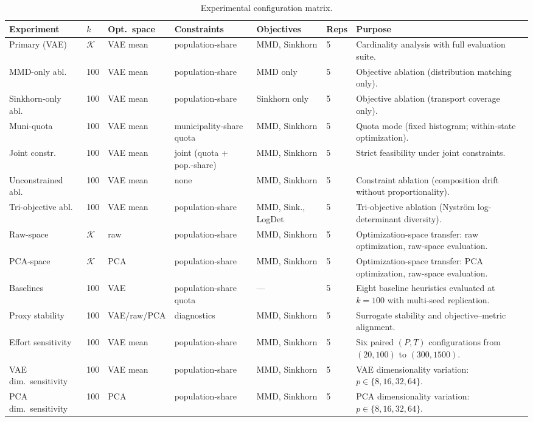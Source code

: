 \documentclass[10pt,journal]{IEEEtran}
\newcommand{\kGrid}{\mathcal{K}}
\newcommand{\1}{\mathbf{1}}
\theoremstyle{ieeethm}
\begin{document}
\begin{table}[t]
\centering
\caption{Experimental configuration matrix.}
\label{tab:run-matrix}
\renewcommand{\arraystretch}{1.05}
\setlength{\tabcolsep}{5pt}
\begin{tabular}{p{}p{}p{}p{}p{}p{}p{}}
\toprule
Experiment & $k$ & Opt.\ space & Constraints & Objectives & Reps & Purpose \\
\midrule
Primary (VAE) & $\kGrid$ & VAE mean & population-share & MMD, Sinkhorn & 5 &
Cardinality analysis with full evaluation suite. \\
MMD-only abl.\ & 100 & VAE mean & population-share & MMD only & 5 &
Objective ablation (distribution matching only). \\
Sinkhorn-only abl.\ & 100 & VAE mean & population-share & Sinkhorn only & 5 &
Objective ablation (transport coverage only). \\
Muni-quota & 100 & VAE mean & municipality-share quota & MMD, Sinkhorn & 5 &
Quota mode (fixed histogram; within-state optimization). \\
Joint constr.\ & 100 & VAE mean & joint (quota + pop.-share) & MMD, Sinkhorn & 5 &
Strict feasibility under joint constraints. \\
Unconstrained abl.\ & 100 & VAE mean & none & MMD, Sinkhorn & 5 &
Constraint ablation (composition drift without proportionality). \\
Tri-objective abl.\ & 100 & VAE mean & population-share & MMD, Sink., LogDet & 5 &
Tri-objective ablation (Nystr\"{o}m log-determinant diversity). \\
Raw-space & $\kGrid$ & raw & population-share & MMD, Sinkhorn & 5 &
Optimization-space transfer: raw optimization, raw-space evaluation. \\
PCA-space & $\kGrid$ & PCA & population-share & MMD, Sinkhorn & 5 &
Optimization-space transfer: PCA optimization, raw-space evaluation. \\
Baselines & 100 & VAE & population-share quota & --- & 5 &
Eight baseline heuristics evaluated at $k{=}100$ with multi-seed replication. \\
Proxy stability & 100 & VAE/raw/PCA & diagnostics & MMD, Sinkhorn & 5 &
Surrogate stability and objective--metric alignment. \\
Effort sensitivity & 100 & VAE mean & population-share & MMD, Sinkhorn & 5 &
Six paired $(P,T)$ configurations from $(20,100)$ to $(300,1500)$. \\
VAE dim.\ sensitivity & 100 & VAE mean & population-share & MMD, Sinkhorn & 5 &
VAE dimensionality variation: $p\in\{8,16,32,64\}$. \\
PCA dim.\ sensitivity & 100 & PCA & population-share & MMD, Sinkhorn & 5 &
PCA dimensionality variation: $p\in\{8,16,32,64\}$. \\
\bottomrule
\end{tabular}
\end{table}
\end{document}
